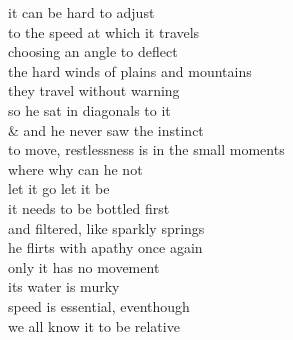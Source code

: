 it can be hard to adjust\\
to the speed at which it travels\\
choosing an angle to deflect\\
the hard winds of plains and mountains\\
they travel without warning\\

so he sat in diagonals to it\\
\& and he never saw the instinct\\
to move, restlessness is in the small moments\\
where why can he not\\
let it go let it be\\

it needs to be bottled first\\
and filtered, like sparkly springs\\
he flirts with apathy once again\\
only it has no movement\\
its water is murky\\
speed is essential, eventhough\\
we all know it to be relative
